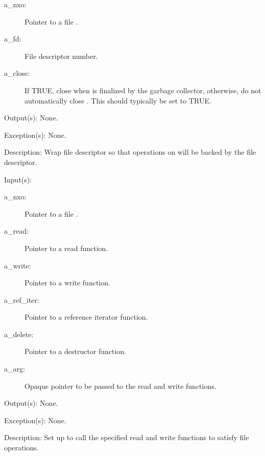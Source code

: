 \begin{capi}
\begin{capilist}
		\begin{description}\item[]
		\item[a\_nxo: ]
			Pointer to a file .
		\item[a\_fd: ]
			File descriptor number.
		\item[a\_close: ] If TRUE, close  when 
			is finalized by the garbage collector, otherwise, do
			not automatically close .  This should
			typically be set to TRUE.
		\end{description}
	\item[Output(s): ] None.
	\item[Exception(s): ] None.
	\item[Description: ]
		Wrap file descriptor  so that operations on
		 will be backed by the file descriptor.
	\end{capilist}
\label{nxo_file_synthetic}
	\begin{capilist}
	\item[Input(s): ]
		\begin{description}\item[]
		\item[a\_nxo: ]
			Pointer to a file .
		\item[a\_read: ]
			Pointer to a read function.
		\item[a\_write: ]
			Pointer to a write function.
		\item[a\_ref\_iter: ]
			Pointer to a reference iterator function.
		\item[a\_delete: ]
			Pointer to a destructor function.
		\item[a\_arg: ]
			Opaque pointer to be passed to the read and write
			functions.
		\end{description}
	\item[Output(s): ] None.
	\item[Exception(s): ] None.
	\item[Description: ]
		Set up  to call the specified read and write
		functions to satisfy file operations.
	\end{capilist}
\label{nxo_file_open}
\end{capi}
